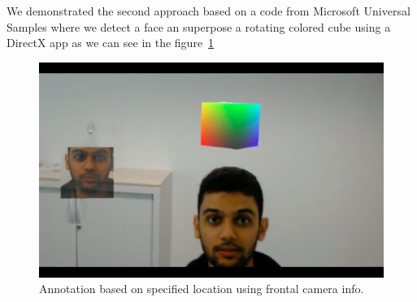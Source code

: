\documentclass[10pt,twocolumn,letterpaper]{article}
\begin{document}
We demonstrated the second approach based on a code from Microsoft Universal Samples where we detect a face an superpose a rotating colored cube using a DirectX app as we can see in the figure~\ref{fig:Holo_FaceTracker}

\begin{figure}[t]
\begin{center}
   \includegraphics[width=0.8\linewidth]{HoloTracker}
\end{center}
   \caption{Annotation based on specified location using frontal camera info.}
\label{fig:Holo_FaceTracker}
\end{figure}

{\small


}
\end{document}
